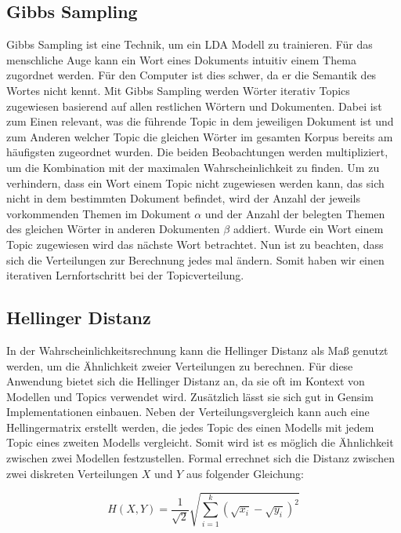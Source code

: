 \documentclass[german,version-2020-11]{uzl-thesis}
\begin{document}
\subsection{Gibbs Sampling}
Gibbs Sampling ist eine Technik, um ein LDA Modell zu trainieren. Für das menschliche Auge kann ein Wort eines Dokuments intuitiv einem Thema zugordnet werden. Für den Computer ist dies schwer, da er die Semantik des Wortes nicht kennt. Mit Gibbs Sampling werden Wörter iterativ Topics zugewiesen basierend auf allen restlichen Wörtern und Dokumenten. Dabei ist zum Einen relevant, was die führende Topic in dem jeweiligen Dokument ist und zum Anderen welcher Topic die gleichen Wörter im gesamten Korpus bereits am häufigsten zugeordnet wurden. Die beiden Beobachtungen werden multipliziert, um die Kombination mit der maximalen Wahrscheinlichkeit zu finden. Um zu verhindern, dass ein Wort einem Topic nicht zugewiesen werden kann, das sich nicht in dem bestimmten Dokument befindet, wird der Anzahl der jeweils vorkommenden Themen im Dokument $\alpha$ und der Anzahl der belegten Themen des gleichen Wörter in anderen Dokumenten $\beta$ addiert.  Wurde ein Wort einem Topic zugewiesen wird das nächste Wort betrachtet. Nun ist zu beachten, dass sich die Verteilungen zur Berechnung jedes mal ändern. Somit haben wir einen iterativen Lernfortschritt bei der Topicverteilung.


\subsection{Hellinger Distanz}
In der Wahrscheinlichkeitsrechnung kann die Hellinger Distanz als Maß genutzt werden, um die Ähnlichkeit zweier Verteilungen zu berechnen. Für diese Anwendung bietet sich die Hellinger Distanz an, da sie oft im Kontext von Modellen und Topics verwendet wird. Zusätzlich lässt sie sich gut in Gensim Implementationen einbauen. Neben der Verteilungsvergleich kann auch eine Hellingermatrix erstellt werden, die jedes Topic des einen Modells mit jedem Topic eines zweiten Modells vergleicht. Somit wird ist es möglich die Ähnlichkeit zwischen zwei Modellen festzustellen. Formal errechnet sich die Distanz zwischen zwei diskreten Verteilungen $X$ und $Y$ aus folgender Gleichung: 

\begin{center}
\begin{equation}
	H(X,Y) = \frac{1}{\sqrt{2}} \sqrt{\sum^k_{i=1}(\sqrt{x_i}-\sqrt{y_i})^2}
\end{equation}
\end{center}
\end{document}
